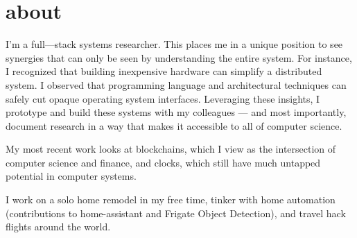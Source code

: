 \section{about}

I'm a full---stack systems researcher. This places me in a unique position to see synergies 
that can only be seen by understanding the entire system. For instance, I recognized that 
building inexpensive hardware 
can simplify a distributed system. I observed that programming language and architectural techniques 
can safely cut opaque operating system interfaces. Leveraging these insights, 
I prototype and build 
these systems with my colleagues --- and most importantly, document research in a way that makes it accessible to all of 
computer science.

My most recent work looks at blockchains, which I view as the intersection of computer science and finance, and clocks, which still have much untapped potential in computer systems.

I work on a solo home remodel in my free time, tinker with home automation (contributions to 
home-assistant and Frigate Object Detection), and travel hack flights around the world.


\clearpage















%


